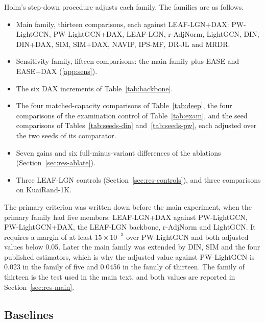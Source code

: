 Holm's step-down procedure \citep{holm1979} adjusts each family. The families are as follows.
\begin{itemize}
\item Main family, thirteen comparisons, each against LEAF-LGN+DAX: PW-LightGCN, PW-LightGCN+DAX, LEAF-LGN, r-AdjNorm, LightGCN, DIN, DIN+DAX,
  SIM, SIM+DAX, NAVIP, IPS-MF, DR-JL and MRDR.
\item Sensitivity family, fifteen comparisons: the main family plus EASE and EASE+DAX (\ref{app:sens}).
\item The six DAX increments of Table~\ref{tab:backbone}.
\item The four matched-capacity comparisons of Table~\ref{tab:deep}, the four comparisons of the examination control of
  Table~\ref{tab:exam}, and the seed comparisons of Tables~\ref{tab:seeds-din} and~\ref{tab:seeds-pw}, each adjusted over the two seeds of its comparator.
\item Seven gains and six full-minus-variant differences of the ablations (Section~\ref{sec:res-ablate}).
\item Three LEAF-LGN controls (Section~\ref{sec:res-controls}), and three comparisons on KuaiRand-1K.
\end{itemize}
The primary criterion was written down before the main experiment, when the primary family had five members: LEAF-LGN+DAX against PW-LightGCN,
PW-LightGCN+DAX, the LEAF-LGN backbone, r-AdjNorm and LightGCN. It requires a margin of at least $15\times10^{-3}$ over PW-LightGCN and both
adjusted values below 0.05. Later the main family was extended by DIN, SIM and the four published estimators, which is why the adjusted value
against PW-LightGCN is 0.023 in the family of five and 0.0456 in the family of thirteen. The family of thirteen is the test used in the main
text, and both values are reported in Section~\ref{sec:res-main}.

\subsection{Baselines}
\label{sec:protocol-baselines}

